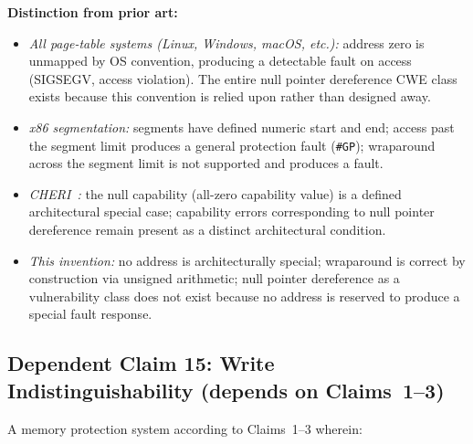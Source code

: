 \documentclass[12pt,letterpaper]{article}
\begin{document}
\textbf{Distinction from prior art:}
\begin{itemize}[noitemsep]
  \item \textit{All page-table systems (Linux, Windows, macOS, etc.):}
        address zero is unmapped by OS convention, producing a
        detectable fault on access (SIGSEGV, access violation).
        The entire null pointer dereference CWE class exists because
        this convention is relied upon rather than designed away.

  \item \textit{x86 segmentation:} segments have defined numeric
        start and end; access past the segment limit produces a
        general protection fault (\texttt{\#GP}); wraparound
        across the segment limit is not supported and produces
        a fault.

  \item \textit{CHERI~\cite{cheri_isca}:} the null capability
        (all-zero capability value) is a defined architectural
        special case; capability errors corresponding to null
        pointer dereference remain present as a distinct
        architectural condition.

  \item \textit{This invention:} no address is architecturally
        special; wraparound is correct by construction via unsigned
        arithmetic; null pointer dereference as a vulnerability
        class does not exist because no address is reserved to
        produce a special fault response.
\end{itemize}

\medskip

\subsection*{Dependent Claim 15: Write Indistinguishability
  (depends on Claims~1--3)}

A memory protection system according to Claims~1--3 wherein:
\end{document}
